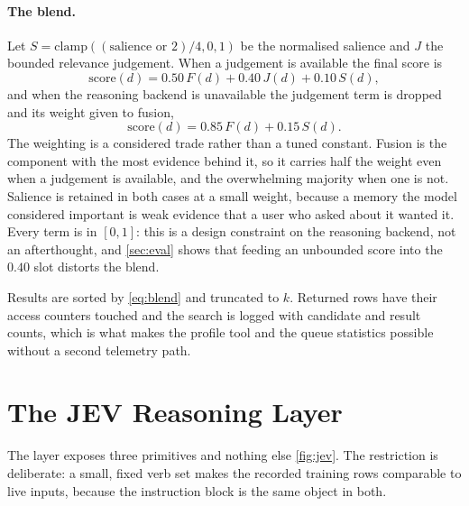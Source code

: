 \documentclass[10pt,twocolumn]{article}
\begin{document}
\paragraph{The blend.}
Let $S=\mathrm{clamp}((\mathrm{salience}\text{ or }2)/4,0,1)$ be the normalised
salience and $J$ the bounded relevance judgement. When a judgement is available
the final score is
\begin{equation}
\mathrm{score}(d)=0.50\,F(d)+0.40\,J(d)+0.10\,S(d),
\label{eq:blend}
\end{equation}
and when the reasoning backend is unavailable the judgement term is dropped and
its weight given to fusion,
\begin{equation}
\mathrm{score}(d)=0.85\,F(d)+0.15\,S(d).
\label{eq:blendfallback}
\end{equation}
The weighting is a considered trade rather than a tuned constant. Fusion is the
component with the most evidence behind it, so it carries half the weight even
when a judgement is available, and the overwhelming majority when one is not.
Salience is retained in both cases at a small weight, because a memory the model
considered important is weak evidence that a user who asked about it wanted it.
Every term is in $[0,1]$: this is a design constraint on the reasoning backend,
not an afterthought, and \cref{sec:eval} shows that feeding an unbounded score
into the $0.40$ slot distorts the blend.

Results are sorted by \cref{eq:blend} and truncated to $k$. Returned rows have
their access counters touched and the search is logged with candidate and
result counts, which is what makes the profile tool and the queue statistics
possible without a second telemetry path.

\section{The JEV Reasoning Layer}
\label{sec:jev}

The layer exposes three primitives and nothing else \cref{fig:jev}. The
restriction is deliberate: a small, fixed verb set makes the recorded training
rows comparable to live inputs, because the instruction block is the same object
in both.
\end{document}
